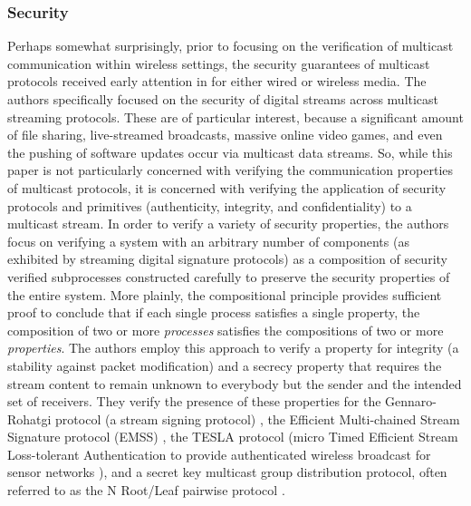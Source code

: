 \documentclass[12pt, fullpage]{article}
\begin{document}
\subsubsection{Security}
Perhaps somewhat surprisingly, prior to focusing on the verification of multicast communication within wireless settings, the security guarantees of multicast protocols received early attention in \cite{Gorrieri2008} for either wired or wireless media. The authors specifically focused on the security of digital streams across multicast streaming protocols. These are of particular interest, because a significant amount of file sharing, live-streamed broadcasts, massive online video games, and even the pushing of software updates occur via multicast data streams. So, while this paper is not particularly concerned with verifying the communication properties of multicast protocols, it is concerned with verifying the application of security protocols and primitives (authenticity, integrity, and confidentiality) to a multicast stream. 
\bigbreak
In order to verify a variety of security properties, the authors focus on verifying a system with an arbitrary number of components (as exhibited by streaming digital signature protocols) as a composition of security verified subprocesses constructed carefully to preserve the security properties of the entire system. More plainly, the compositional principle provides sufficient proof to conclude that if each single process satisfies a single property, the composition of two or more \textit{processes} satisfies the compositions of two or more \textit{properties}. The authors employ this approach to verify a property for integrity (a stability against packet modification) and a secrecy property that requires the stream content to remain unknown to everybody but the sender and the intended set of receivers. They verify the presence of these properties for the Gennaro-Rohatgi protocol (a stream signing protocol) \cite{Gennaro2001}, the Efficient Multi-chained Stream Signature protocol (EMSS) \cite{Perrig2000}, the \textmugreek TESLA protocol (micro Timed Efficient Stream Loss-tolerant Authentication to provide authenticated wireless broadcast for sensor networks \cite{Perrig2002}), and a secret key multicast group distribution protocol, often referred to as the N Root/Leaf pairwise protocol \cite{rfc2627}.
\bigbreak
\end{document}
